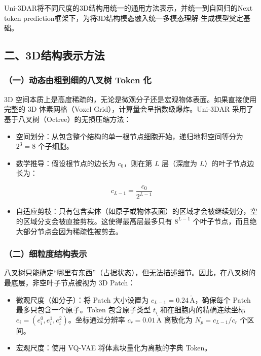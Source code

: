 Uni-3DAR将不同尺度的3D结构用统一的通用方法表示，并统一到自回归的Next token prediction框架下，为将3D结构模态融入统一多模态理解-生成模型奠定基础。

\hypertarget{ux4e8c3dux7ed3ux6784ux8868ux793aux65b9ux6cd5}{%
\subsection{二、3D结构表示方法}\label{ux4e8c3dux7ed3ux6784ux8868ux793aux65b9ux6cd5}}

\hypertarget{ux4e00ux52a8ux6001ux7531ux7c97ux5230ux7ec6ux7684ux516bux53c9ux6811-token-ux5316}{%
\subsubsection{（一）动态由粗到细的八叉树 Token 化}\label{ux4e00ux52a8ux6001ux7531ux7c97ux5230ux7ec6ux7684ux516bux53c9ux6811-token-ux5316}}

3D 空间本质上是高度稀疏的，无论是微观分子还是宏观物体表面。如果直接使用完整的 3D 体素网格（Voxel Grid），计算量会呈指数级爆炸。Uni-3DAR 采用了基于八叉树（Octree）的无损压缩方法：

\begin{itemize}
\tightlist
\item
  空间划分：从包含整个结构的单一根节点细胞开始，递归地将空间等分为 \(2^3 = 8\) 个子细胞。
\item
  数学推导：假设根节点的边长为 \(c_0\)，则在第 \(L\) 层（深度为 \(L\)）的叶子节点边长为：
\end{itemize}

\[
c_{L-1} = \frac{c_0}{2^{L-1}}
\]

\begin{itemize}
\tightlist
\item
  自适应剪枝：只有包含实体（如原子或物体表面）的区域才会被继续划分，空的区域分支会被直接剪枝。这使得最高层最多只有 \(8^{L-1}\) 个叶子节点，而且绝大部分节点会因为稀疏性被剪去。
\end{itemize}

\hypertarget{ux4e8cux7ec6ux7c92ux5ea6ux7ed3ux6784ux8868ux793a}{%
\subsubsection{（二）细粒度结构表示}\label{ux4e8cux7ec6ux7c92ux5ea6ux7ed3ux6784ux8868ux793a}}

八叉树只能确定``哪里有东西''（占据状态），但无法描述细节。因此，在八叉树的最底层，非空叶子节点被视为 3D Patch：

\begin{itemize}
\tightlist
\item
  微观尺度（如分子）：将 Patch 大小设置为 \(c_{L-1}=0.24\,\mathrm{\mathring{A}}\)，确保每个 Patch 最多只包含一个原子。Token 包含原子类型 \(t_i\) 和在细胞内的精确连续坐标 \(e_i=(e_i^0,e_i^1,e_i^2)\)。坐标通过分辨率 \(c_r=0.01\,\mathrm{\mathring{A}}\) 离散化为 \(N_p=c_{L-1}/c_r\) 个区间。
\item
  宏观尺度：使用 VQ-VAE 将体素块量化为离散的字典 Token。
\end{itemize}

